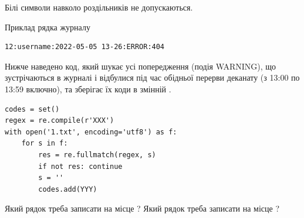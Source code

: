 \documentclass[12pt, ukrainian]{article}
\begin{document}
{Білі символи навколо роздільників не допускаються.

Приклад рядка журналу



\begin{verbatim}
12:username:2022-05-05 13-26:ERROR:404
\end{verbatim}


Нижче наведено код, який шукає усі попередження (подія WARNING), що зустрі\-ча\-ються в журналі і відбулися під час обідньої перерви деканату (з 13:00 по 13:59 включно), та зберігає їх коди в змінній .



\begin{verbatim}
codes = set()
regex = re.compile(r'XXX')
with open('1.txt', encoding='utf8') as f:
    for s in f:
        res = re.fullmatch(regex, s)
        if not res: continue
        s = ''
        codes.add(YYY)
\end{verbatim}





Який рядок треба записати на місце  ?
Який рядок треба записати на місце  ?\par

}
\newpage
\end{document}
